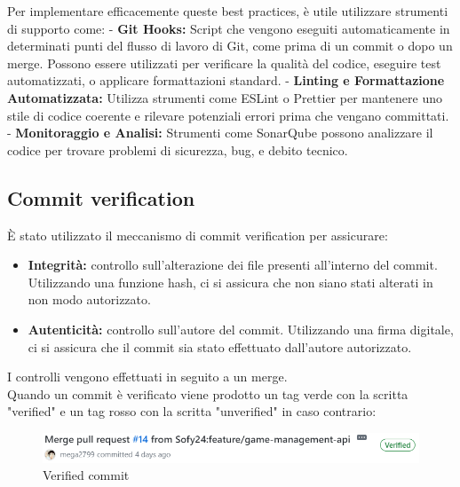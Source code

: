 Per implementare efficacemente queste best practices, è utile utilizzare strumenti di supporto come:
- \textbf{Git Hooks:} Script che vengono eseguiti automaticamente in determinati punti del flusso di lavoro di Git, come prima di un commit o dopo un merge. Possono essere utilizzati per verificare la qualità del codice, eseguire test automatizzati, o applicare formattazioni standard.
- \textbf{Linting e Formattazione Automatizzata:} Utilizza strumenti come ESLint o Prettier per mantenere uno stile di codice coerente e rilevare potenziali errori prima che vengano committati.
- \textbf{Monitoraggio e Analisi:} Strumenti come SonarQube possono analizzare il codice per trovare problemi di sicurezza, bug, e debito tecnico.

\subsection{Commit verification}
È stato utilizzato il meccanismo di commit verification per assicurare:
\begin{itemize}
    \item \textbf{Integrità:} controllo sull'alterazione dei file presenti all'interno del commit.  Utilizzando una funzione hash, ci si assicura che non siano stati alterati in non modo autorizzato.
    \item \textbf{Autenticità:} controllo sull'autore del commit. Utilizzando una firma digitale, ci si assicura che il commit sia stato effettuato dall'autore autorizzato.
\end{itemize}
I controlli vengono effettuati in seguito a un merge. \\
Quando un commit è verificato viene prodotto un tag verde con la scritta "verified" e un tag rosso con la scritta "unverified" in caso contrario:
\begin{figure}[h!]
    \centering 
    \includegraphics[scale=0.7]{report/img/verified_commit.png}
    \caption{Verified commit}
    \label{verified_commit}
    \end{figure}

